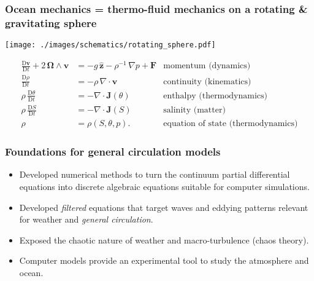 \documentclass[10pt]{beamer}
\begin{document}
\begin{frame}
  \frametitle{Ocean mechanics = thermo-fluid mechanics on a rotating
    \& gravitating sphere}

\begin{center}
\vspace{-.25cm}
{\texttt{[image: ./images/schematics/rotating\_sphere.pdf]}}
\end{center}


\footnotesize 
\begin{align}
  \frac{\mathrm{D} {\bm v}  }{\mathrm{D}t} 
  + 2  \, {\bm \Omega} \wedge {\bm v} &= 
  - g \, \hat{\bm z} -\rho^{-1} \,  \nabla p + {\bm F}
 & \mbox{momentum (dynamics)}  
\label{eq:gfd-fluid-equation-of-motion-summary} 
  \\
  \frac{\mathrm{D}\rho}{\mathrm{D}t} &= -\rho \, \nabla \cdot {\bm v}
 &  \mbox{continuity (kinematics)}  
\label{eq:gfd-fluid-mass-equation-summary} 
  \\
 \rho \, \frac{\mathrm{D}\theta}{\mathrm{D}t}
 &= -\nabla \cdot {\bm J}(\theta)
 & \mbox{enthalpy (thermodynamics)}
  \label{eq:gfd-fluid-thermo-equation-summary} 
  \\
 \rho \, \frac{\mathrm{D}S}{\mathrm{D}t} 
 &= -\nabla \cdot {\bm J}(S)
 & \mbox{salinity (matter)}
\label{eq:gfd-fluid-matter-equation-summary} 
 \\
   \rho &= \rho(S,\theta,p). 
 & \mbox{equation of state (thermodynamics)}
\label{eq:eos-summary}   
\end{align}

\end{frame}


\begin{frame}
  \frametitle{Foundations for general circulation models}

\begin{center}
\vspace{-.25cm}
\end{center}

\begin{exampleblock}{}
\begin{itemize}

\item Developed numerical methods to turn the continuum partial
  differential equations into discrete algebraic equations suitable
  for computer simulations.

\item Developed {\it filtered} equations that target waves and eddying
  patterns relevant for weather and {\it general circulation}.

\item Exposed the chaotic nature of weather and macro-turbulence (chaos theory). 

\item Computer models provide an experimental tool to study the
  atmosphere and ocean.

\end{itemize}
\end{exampleblock}{}

\end{frame}
\end{document}
